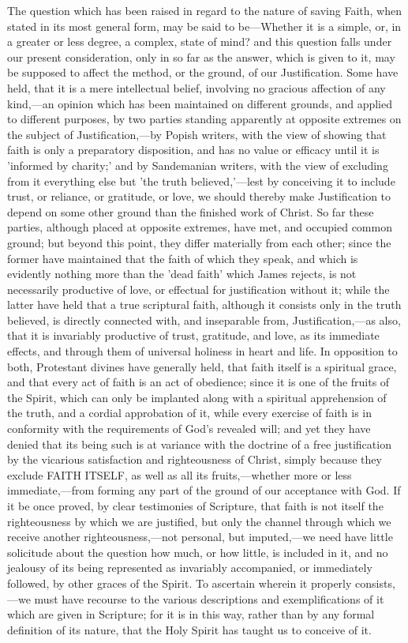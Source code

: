 \documentclass[
]{book}
\begin{document}
The question which has been raised in regard to the nature of saving Faith, when stated in its most general form, may be said to be---Whether it is a simple, or, in a greater or less degree, a complex, state of mind? and this question falls under our present consideration, only in so far as the answer, which is given to it, may be supposed to affect the method, or the ground, of our Justification. Some have held, that it is a mere intellectual belief, involving no gracious affection of any kind,---an opinion which has been maintained on different grounds, and applied to different purposes, by two parties standing apparently at opposite extremes on the subject of Justification,---by Popish writers, with the view of showing that faith is only a preparatory disposition, and has no value or efficacy until it is 'informed by charity;' and by Sandemanian writers, with the view of excluding from it everything else but 'the truth believed,'---lest by conceiving it to include trust, or reliance, or gratitude, or love, we should thereby make Justification to depend on some other ground than the finished work of Christ. So far these parties, although placed at opposite extremes, have met, and occupied common ground; but beyond this point, they differ materially from each other; since the former have maintained that the faith of which they speak, and which is evidently nothing more than the 'dead faith' which James rejects, is not necessarily productive of love, or effectual for justification without it; while the latter have held that a true scriptural faith, although it consists only in the truth believed, is directly connected with, and inseparable from, Justification,---as also, that it is invariably productive of trust, gratitude, and love, as its immediate effects, and through them of universal holiness in heart and life. In opposition to both, Protestant divines have generally held, that faith itself is a spiritual grace, and that every act of faith is an act of obedience; since it is one of the fruits of the Spirit, which can only be implanted along with a spiritual apprehension of the truth, and a cordial approbation of it, while every exercise of faith is in conformity with the requirements of God's revealed will; and yet they have denied that its being such is at variance with the doctrine of a free justification by the vicarious satisfaction and righteousness of Christ, simply because they exclude FAITH ITSELF, as well as all its fruits,---whether more or less immediate,---from forming any part of the ground of our acceptance with God. If it be once proved, by clear testimonies of Scripture, that faith is not itself the righteousness by which we are justified, but only the channel through which we receive another righteousness,---not personal, but imputed,---we need have little solicitude about the question how much, or how little, is included in it, and no jealousy of its being represented as invariably accompanied, or immediately followed, by other graces of the Spirit. To ascertain wherein it properly consists,---we must have recourse to the various descriptions and exemplifications of it which are given in Scripture; for it is in this way, rather than by any formal definition of its nature, that the Holy Spirit has taught us to conceive of it.
\end{document}
